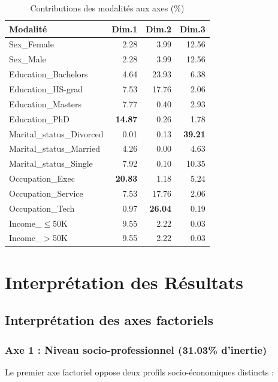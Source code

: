 \documentclass[12pt,a4paper]{article}
\begin{document}
\begin{table}[H]
\centering
\caption{Contributions des modalités aux axes (\%)}
\footnotesize
\begin{tabular}{|l|r|r|r|}
\hline
\textbf{Modalité} & \textbf{Dim.1} & \textbf{Dim.2} & \textbf{Dim.3} \\
\hline
Sex\_Female & 2.28 & 3.99 & 12.56 \\
Sex\_Male & 2.28 & 3.99 & 12.56 \\
Education\_Bachelors & 4.64 & 23.93 & 6.38 \\
Education\_HS-grad & 7.53 & 17.76 & 2.06 \\
Education\_Masters & 7.77 & 0.40 & 2.93 \\
Education\_PhD & \textbf{14.87} & 0.26 & 1.78 \\
Marital\_status\_Divorced & 0.01 & 0.13 & \textbf{39.21} \\
Marital\_status\_Married & 4.26 & 0.00 & 4.63 \\
Marital\_status\_Single & 7.92 & 0.10 & 10.35 \\
Occupation\_Exec & \textbf{20.83} & 1.18 & 5.24 \\
Occupation\_Service & 7.53 & 17.76 & 2.06 \\
Occupation\_Tech & 0.97 & \textbf{26.04} & 0.19 \\
Income\_$\leq$50K & 9.55 & 2.22 & 0.03 \\
Income\_$>$50K & 9.55 & 2.22 & 0.03 \\
\hline
\end{tabular}
\end{table}

\section{Interprétation des Résultats}

\subsection{Interprétation des axes factoriels}

\subsubsection{Axe 1 : Niveau socio-professionnel (31.03\% d'inertie)}

Le premier axe factoriel oppose deux profils socio-économiques distincts :
\end{document}
